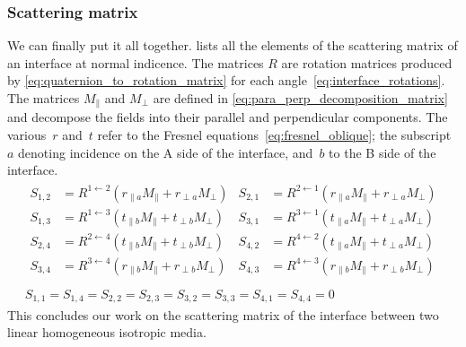 \subsubsection{Scattering matrix}
We can finally put it all together.
 lists all the elements of the scattering matrix of an interface at normal indicence.
The matrices $R$ are rotation matrices produced by \cref{eq:quaternion_to_rotation_matrix} for each angle~\eqref{eq:interface_rotations}.
The matrices $M_\parallel$ and $M_\perp$ are defined in \cref{eq:para_perp_decomposition_matrix} and decompose the fields into their parallel and perpendicular components.
The various~$r$ and~$t$ refer to the Fresnel equations~\eqref{eq:fresnel_oblique}; the subscript~$a$ denoting incidence on the A side of the interface, and~$b$ to the B side of the interface.
\begin{equation}
    \begin{gathered}
    \begin{aligned}
        S_{1, 2} &= R^{1 \leftarrow 2} \left(
            r_{\parallel a} M_\parallel +
            r_{\perp a} M_\perp
        \right)
        &
        S_{2, 1} &= R^{2 \leftarrow 1} \left(
            r_{\parallel a} M_\parallel +
            r_{\perp a} M_\perp
        \right)
        \\
        S_{1, 3} &= R^{1 \leftarrow 3} \left(
            t_{\parallel b} M_\parallel +
            t_{\perp b} M_\perp
        \right)
        &
        S_{3, 1} &= R^{3 \leftarrow 1} \left(
            t_{\parallel a} M_\parallel +
            t_{\perp a} M_\perp
        \right)
        \\
        S_{2, 4} &= R^{2 \leftarrow 4} \left(
            t_{\parallel b} M_\parallel +
            t_{\perp b} M_\perp
        \right)
        &
        S_{4, 2} &= R^{4 \leftarrow 2} \left(
            t_{\parallel a} M_\parallel +
            t_{\perp a} M_\perp
        \right)
        \\
        S_{3, 4} &= R^{3 \leftarrow 4} \left(
            r_{\parallel b} M_\parallel +
            r_{\perp b} M_\perp
        \right)
        &
        S_{4, 3} &= R^{4 \leftarrow 3} \left(
            r_{\parallel b} M_\parallel +
            r_{\perp b} M_\perp
        \right)
        \\
    \end{aligned}
    \\
    S_{1, 1} = S_{1, 4} = S_{2, 2} = S_{2, 3} = S_{3, 2} = S_{3, 3} = S_{4, 1} = S_{4, 4} = 0
    \end{gathered}
    \label{eq:interface_S}
\end{equation}
This concludes our work on the scattering matrix of the interface between two linear homogeneous isotropic media.


